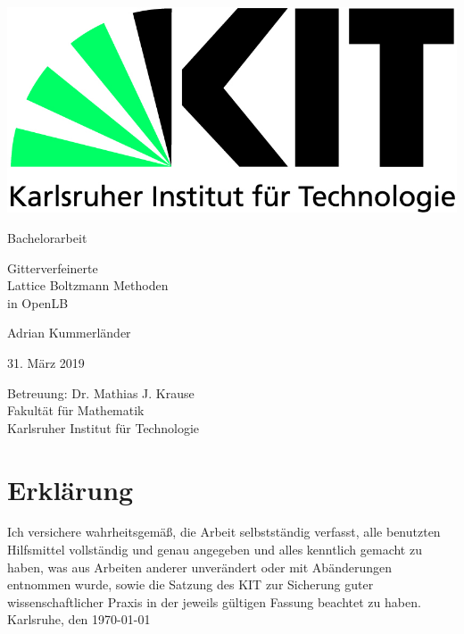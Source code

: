 \documentclass[12pt,a4paper]{scrartcl}
\begin{document}
\pagestyle{empty}
\begin{titlepage}

\includegraphics[scale=0.45]{img/static/kit-logo.jpg}
\vspace*{2cm}

\begin{center} \large
Bachelorarbeit
\vspace*{2cm}

{\huge Gitterverfeinerte \\ Lattice Boltzmann Methoden \\ in OpenLB \\}
\vspace*{2.5cm}

Adrian Kummerländer
\vspace*{1.5cm}

31. März 2019
\vspace*{3cm}

Betreuung: Dr. Mathias J. Krause \\[1cm]
Fakultät für Mathematik \\[1cm]
Karlsruher Institut für Technologie
\end{center}

\end{titlepage}

\tableofcontents
\newpage

\pagestyle{headings}



\newpage
\listoffigures

\newpage
\printbibliography

\newpage
\thispagestyle{empty}
\vspace*{8cm}
\section*{Erkl\"arung}
Ich  versichere  wahrheitsgem\"a\ss,  die  Arbeit selbstst\"andig verfasst,  alle  benutzten  Hilfsmittel  vollst\"andig  und  genau  angegeben  und  alles kenntlich  gemacht  zu  haben,  was  aus  Arbeiten  anderer  unver\"andert  oder  mit  Ab\"anderungen entnommen  wurde,  sowie die Satzung  des  KIT  zur  Sicherung guter wissenschaftlicher Praxis in der jeweils g\"ultigen Fassung beachtet zu haben.
\\[2ex]
\noindent
Karlsruhe, den \today\\[5ex]
\end{document}
